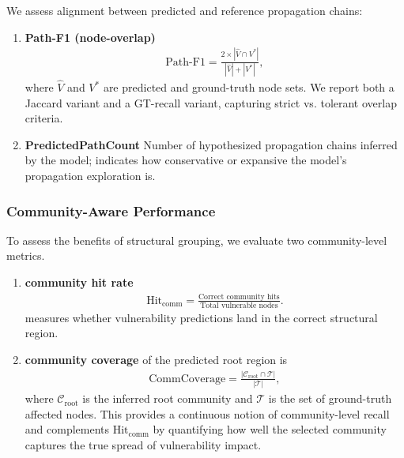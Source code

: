 We assess alignment between predicted and reference propagation chains:
\begin{enumerate}
    \item \textbf{Path-F1 (node-overlap)}
    \begin{align}
    \mathrm{Path\text{-}F1}
    = \frac{2 \times |\hat{V} \cap V^*|}{|\hat{V}| + |V^*|},
    \end{align}
    where $\hat{V}$ and $V^*$ are predicted and ground-truth node sets.
    We report both a Jaccard variant \cite{niwattanakul2013using} and a GT-recall variant, capturing strict vs. tolerant overlap criteria.

    \item \textbf{PredictedPathCount}
    Number of hypothesized propagation chains inferred by the model;
    indicates how conservative or expansive the model’s propagation exploration is.

\end{enumerate}


\subsubsection{Community-Aware Performance}

To assess the benefits of structural grouping, we evaluate two community-level metrics.  
\begin{enumerate}
    \item \textbf{community hit rate}
    \begin{align}
    \mathrm{Hit_{comm}}
    =
    \frac{\text{Correct community hits}}
         {\text{Total vulnerable nodes}}.
    \end{align}
    measures whether vulnerability predictions land in the correct structural region.  
    \item \textbf{community coverage} of the predicted root region is
    \begin{align}
    \mathrm{CommCoverage}
    =
    \frac{|\mathcal{C}_{\mathrm{root}}\cap \mathcal{T}|}{|\mathcal{T}|},
    \end{align}
    where $\mathcal{C}_{\mathrm{root}}$ is the inferred root community 
    and $\mathcal{T}$ is the set of ground-truth affected nodes.   
    This provides a continuous notion of community-level recall and complements 
    $\mathrm{Hit_{comm}}$ by quantifying how well the selected community 
    captures the true spread of vulnerability impact.
\end{enumerate}
